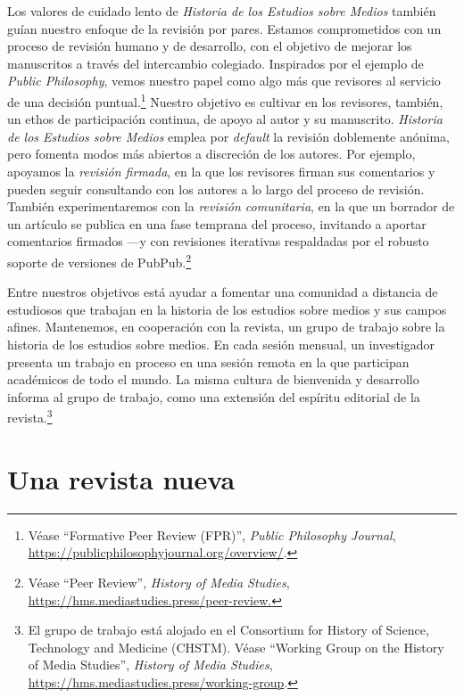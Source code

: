 \documentclass{tufte-handout}
\begin{document}
Los valores de cuidado lento de \emph{Historia de los Estudios sobre
Medios} también guían nuestro enfoque de la revisión por pares. Estamos
comprometidos con un proceso de revisión humano y de desarrollo, con el
objetivo de mejorar los manuscritos a través del intercambio colegiado.
Inspirados por el ejemplo de \emph{Public Philosophy}, vemos nuestro
papel como algo más que revisores al servicio de una decisión
puntual.\footnote{Véase ``Formative Peer Review (FPR)'', \emph{Public
  Philosophy Journal},
  \url{https://publicphilosophyjournal.org/overview/}.} Nuestro objetivo
es cultivar en los revisores, también, un ethos de participación
continua, de apoyo al autor y su manuscrito. \emph{Historia de los
Estudios sobre Medios} emplea por \emph{default} la revisión doblemente
anónima, pero fomenta modos más abiertos a discreción de los autores.
Por ejemplo, apoyamos la \emph{revisión firmada}, en la que los
revisores firman sus comentarios y pueden seguir consultando con los
autores a lo largo del proceso de revisión. También experimentaremos con
la \emph{revisión comunitaria}, en la que un borrador de un artículo se
publica en una fase temprana del proceso, invitando a aportar
comentarios firmados ---y con revisiones iterativas respaldadas por el
robusto soporte de versiones de PubPub.\footnote{Véase ``Peer Review'',
  \emph{History of Media Studies},
  \url{https://hms.mediastudies.press/peer-review.}}

Entre nuestros objetivos está ayudar a fomentar una comunidad a
distancia de estudiosos que trabajan en la historia de los estudios
sobre medios y sus campos afines. Mantenemos, en cooperación con la
revista, un grupo de trabajo sobre la historia de los estudios sobre
medios. En cada sesión mensual, un investigador presenta un trabajo en
proceso en una sesión remota en la que participan académicos de todo el
mundo. La misma cultura de bienvenida y desarrollo informa al grupo de
trabajo, como una extensión del espíritu editorial de la
revista.\footnote{El grupo de trabajo está alojado en el Consortium for
  History of Science, Technology and Medicine (CHSTM). Véase ``Working
  Group on the History of Media Studies'', \emph{History of Media
  Studies}, \url{https://hms.mediastudies.press/working-group}.}

\hypertarget{una-revista-nueva}{%
\section{Una revista nueva}\label{una-revista-nueva}}
\end{document}
